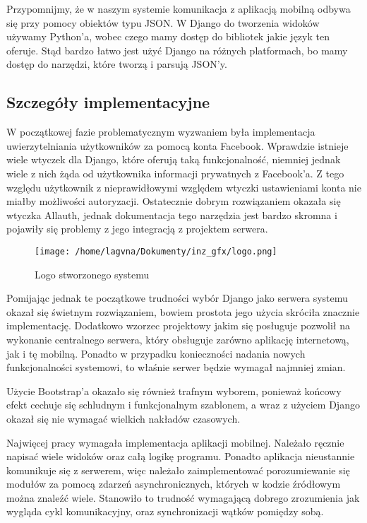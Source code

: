 \documentclass[12pt,titlepage]{article}
\begin{document}
Przypomnijmy, że w naszym systemie komunikacja z aplikacją mobilną odbywa się przy pomocy obiektów typu JSON. W Django do tworzenia widoków używamy Python'a, wobec czego mamy dostęp do bibliotek
jakie język ten oferuje. Stąd bardzo łatwo jest użyć Django na różnych platformach, bo mamy dostęp do narzędzi, które tworzą i parsują JSON'y.
\subsection{Szczegóły implementacyjne}


W początkowej fazie problematycznym wyzwaniem była implementacja uwierzytelniania użytkowników za pomocą konta Facebook. Wprawdzie istnieje wiele wtyczek dla Django, które oferują taką funkcjonalność,
niemniej jednak wiele z nich żąda od użytkownika informacji prywatnych z Facebook'a. Z tego względu użytkownik z nieprawidłowymi względem wtyczki ustawieniami konta nie miałby możliwości autoryzacji.
Ostatecznie dobrym rozwiązaniem okazała się wtyczka Allauth, jednak dokumentacja tego narzędzia jest bardzo skromna i pojawiły się problemy z jego integracją z projektem serwera.
\begin{figure}[htb]
 \begin{center}
 \texttt{[image: /home/lagvna/Dokumenty/inz\_gfx/logo.png]}
 \caption{Logo stworzonego systemu}
 \label{fig:logo}
 \end{center}
\end{figure}

Pomijając jednak te początkowe trudności wybór Django jako serwera systemu okazał się świetnym rozwiązaniem, bowiem prostota jego użycia skróciła znacznie implementację. Dodatkowo wzorzec
projektowy jakim się posługuje pozwolił na wykonanie centralnego serwera, który obsługuje zarówno aplikację internetową, jak i tę mobilną. Ponadto w przypadku konieczności nadania nowych
funkcjonalności systemowi, to właśnie serwer będzie wymagał najmniej zmian.

Użycie Bootstrap'a okazało się również trafnym wyborem, ponieważ końcowy efekt cechuje się schludnym i funkcjonalnym szablonem, a wraz z użyciem Django okazał się nie wymagać wielkich nakładów
czasowych.

Najwięcej pracy wymagała implementacja aplikacji mobilnej. Należało ręcznie napisać wiele widoków oraz całą logikę programu. Ponadto aplikacja nieustannie komunikuje się z serwerem, 
więc należało zaimplementować porozumiewanie się modułów za pomocą zdarzeń asynchronicznych, których w kodzie źródłowym można znaleźć wiele. Stanowiło to trudność wymagającą dobrego zrozumienia
jak wygląda cykl komunikacyjny, oraz synchronizacji wątków pomiędzy sobą.
\end{document}
